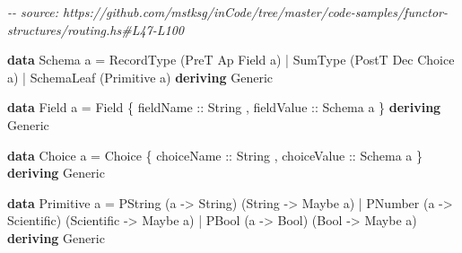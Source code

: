 \documentclass[]{article}
\newenvironment{Shaded}{}{}
\newcommand{\CommentTok}[1]{\textcolor[rgb]{0.38,0.63,0.69}{\textit{#1}}}
\newcommand{\DataTypeTok}[1]{\textcolor[rgb]{0.56,0.13,0.00}{#1}}
\newcommand{\KeywordTok}[1]{\textcolor[rgb]{0.00,0.44,0.13}{\textbf{#1}}}
\newcommand{\NormalTok}[1]{#1}
\newcommand{\OperatorTok}[1]{\textcolor[rgb]{0.40,0.40,0.40}{#1}}
\newcommand{\OtherTok}[1]{\textcolor[rgb]{0.00,0.44,0.13}{#1}}
\begin{document}
\begin{Shaded}
\begin{Highlighting}[]
\CommentTok{{-}{-} source: https://github.com/mstksg/inCode/tree/master/code{-}samples/functor{-}structures/routing.hs\#L47{-}L100}

\KeywordTok{data} \DataTypeTok{Schema}\NormalTok{ a }\OtherTok{=}
      \DataTypeTok{RecordType}\NormalTok{  (}\DataTypeTok{PreT}  \DataTypeTok{Ap}  \DataTypeTok{Field}\NormalTok{  a)}
    \OperatorTok{|} \DataTypeTok{SumType}\NormalTok{     (}\DataTypeTok{PostT} \DataTypeTok{Dec} \DataTypeTok{Choice}\NormalTok{ a)}
    \OperatorTok{|} \DataTypeTok{SchemaLeaf}\NormalTok{  (}\DataTypeTok{Primitive}\NormalTok{ a)}
  \KeywordTok{deriving} \DataTypeTok{Generic}

\KeywordTok{data} \DataTypeTok{Field}\NormalTok{ a }\OtherTok{=} \DataTypeTok{Field}
\NormalTok{    \{}\OtherTok{ fieldName  ::} \DataTypeTok{String}
\NormalTok{    ,}\OtherTok{ fieldValue ::} \DataTypeTok{Schema}\NormalTok{ a}
\NormalTok{    \}}
  \KeywordTok{deriving} \DataTypeTok{Generic}

\KeywordTok{data} \DataTypeTok{Choice}\NormalTok{ a }\OtherTok{=} \DataTypeTok{Choice}
\NormalTok{    \{}\OtherTok{ choiceName  ::} \DataTypeTok{String}
\NormalTok{    ,}\OtherTok{ choiceValue ::} \DataTypeTok{Schema}\NormalTok{ a}
\NormalTok{    \}}
  \KeywordTok{deriving} \DataTypeTok{Generic}

\KeywordTok{data} \DataTypeTok{Primitive}\NormalTok{ a }\OtherTok{=}
      \DataTypeTok{PString}\NormalTok{ (a }\OtherTok{{-}>} \DataTypeTok{String}\NormalTok{)     (}\DataTypeTok{String}     \OtherTok{{-}>} \DataTypeTok{Maybe}\NormalTok{ a)}
    \OperatorTok{|} \DataTypeTok{PNumber}\NormalTok{ (a }\OtherTok{{-}>} \DataTypeTok{Scientific}\NormalTok{) (}\DataTypeTok{Scientific} \OtherTok{{-}>} \DataTypeTok{Maybe}\NormalTok{ a)}
    \OperatorTok{|} \DataTypeTok{PBool}\NormalTok{   (a }\OtherTok{{-}>} \DataTypeTok{Bool}\NormalTok{)       (}\DataTypeTok{Bool}       \OtherTok{{-}>} \DataTypeTok{Maybe}\NormalTok{ a)}
  \KeywordTok{deriving} \DataTypeTok{Generic}


\end{Highlighting}
\end{Shaded}
\end{document}
